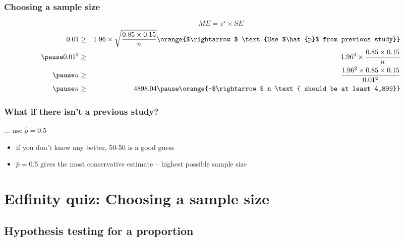 \documentclass[slidestop,compress,mathserif]{beamer}
\begin{document}

\begin{frame}
\frametitle{Choosing a sample size}

\pause
\[ ME = z^\star \times SE\]
\pause
\begin{eqnarray*}
0.01 &\ge& 1.96 \times \sqrt{\frac{0.85 \times 0.15}{n}} \orange{$\rightarrow$ \text{Use $\hat{p}$ from previous study}} \\
\pause
0.01^2 &\ge& 1.96^2 \times \frac{0.85 \times 0.15}{n} \\
\pause
n &\ge& \frac{1.96^2 \times 0.85 \times 0.15}{0.01^2} \\
\pause
n &\ge& 4898.04 \pause \orange{~$\rightarrow$ n \text{ should be at least 4,899}}
\end{eqnarray*}

\end{frame}


\begin{frame}
\frametitle{What if there isn't a previous study?}

... use $\hat{p} = 0.5$

\vspace{1cm}

\pause

\begin{itemize}
\item if you don't know any better, 50-50 is a good guess
\pause
\item $\hat{p} = 0.5$ gives the most conservative estimate -- highest possible sample size
\end{itemize}

\end{frame}


\section{Edfinity quiz: Choosing a sample size} 


\subsection{Hypothesis testing for a proportion}
\end{document}
